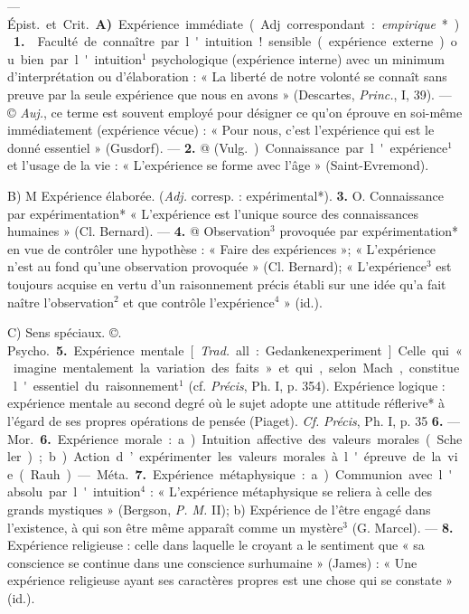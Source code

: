 \begin{itemize}[leftmargin=1cm, label=, itemsep=1pt]
 — \si{Épist.} et \si{Crit.} {\bf A)} \si{Expérience immédiate}. (Adj. correspondant : {\it empirique}*). {\bf 1.}  Faculté
de connaître par l'intuition! sensible (expérience externe) ou bien
par l'intuition$^1$ psychologique (expérience interne) avec un minimum
d'interprétation ou d'élaboration :
« La liberté de notre volonté se
connaît sans preuve par la seule
expérience que nous en avons »
(Descartes, {\it Princ.}, I, 39). — © {\it Auj.},
ce terme est souvent employé pour
désigner ce qu’on éprouve en soi-même immédiatement (expérience
vécue) : « Pour nous, c’est l’expérience qui est le donné essentiel »
(Gusdorf). — {\bf 2.} @ (\si{Vulg.}) Connaissance par l'expérience$^1$ et l'usage
de la vie : « L'expérience se forme
avec l’âge » (Saint-Evremond).

B) M Expérience élaborée. ({\it Adj.}
corresp. : expérimental*). {\bf 3.} O. Connaissance par expérimentation*
« L'expérience est l'unique source
des connaissances humaines » (Cl.
Bernard). — {\bf 4.} @ Observation$^3$ provoquée par expérimentation* en
vue de contrôler une hypothèse :
« Faire des expériences »; « L’expérience n’est au fond qu’une observation provoquée » (Cl. Bernard);
« L'expérience$^3$ est toujours acquise
en vertu d'un raisonnement précis
établi sur une idée qu’a fait naître
l'observation$^2$ et que contrôle l’expérience$^4$ » (id.).

C) Sens spéciaux. ©. \si{Psycho.}
 {\bf 5.} Expérience mentale [{\it Trad.} all. :
Gedankenexperiment]. Celle qui
« imagine mentalement la variation
des faits » et qui, selon Mach, constitue l'essentiel du raisonnement$^1$
(cf.  {\it Précis}, Ph. I, p. 354). Expérience logique : expérience mentale
au second degré où le sujet adopte
une attitude réflerive* à l'égard de
ses propres opérations de pensée
(Piaget). {\it Cf.}  {\it Précis}, Ph. I, p. 35 {\bf 6.} —
\si{Mor.} {\bf 6.} Expérience morale : a) Intuition affective des valeurs morales
(Scheler); b) Action d’expérimenter
les valeurs morales à l'épreuve de
la vie (Rauh). — \si{Méta.} {\bf 7.} Expérience métaphysique : a) Communion
avec l'absolu par l'intuition$^4$ :
« L'expérience métaphysique se
reliera à celle des grands mystiques »
(Bergson, {\it P. M.} II); b) Expérience
de l’être engagé dans l'existence, à
qui son être même apparaît comme
un mystère$^3$ (G. Marcel). — {\bf 8.} Expérience religieuse : celle dans laquelle
le croyant a le sentiment que « sa
conscience se continue dans une
conscience surhumaine » (James) :
« Une expérience religieuse ayant ses
caractères propres est une chose
qui se constate » (id.).


\end{itemize}
